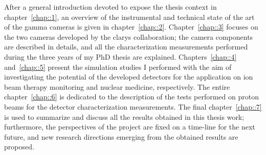 After a general introduction devoted to expose the thesis context in chapter~\ref{chap::1}, an overview of the instrumental and technical state of the art of the gamma cameras is given in chapter~\ref{chap::2}. Chapter~\ref{chap::3} focuses on the two cameras developed by the \acrshort{clarys} collaboration; the camera components are described in details, and all the characterization measurements performed during the three years of my PhD thesis are explained. Chapters~\ref{chap::4} and~\ref{chap::5} present the simulation studies I performed with the aim of investigating the potential of the developed detectors for the application on ion beam therapy monitoring and nuclear medicine, respectively. The entire chapter~\ref{chap::6} is dedicated to the description of the tests performed on proton beams for the detector characterization measurements. The final chapter~\ref{chap::7} is used to summarize and discuss all the results obtained in this thesis work; furthermore, the perspectives of the project are fixed on a time-line for the next future, and new research directions emerging from the obtained results are proposed.        